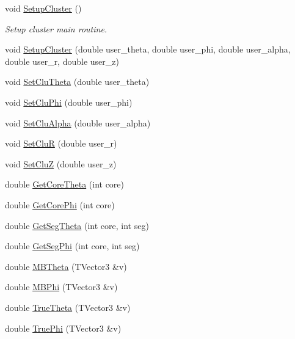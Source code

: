 \begin{DoxyCompactItemize}
\mbox{\label{class_m_b_geometry_a4d98a38f0dc1ca6a4a73477dde5cdd8d}} 
void \hyperlink{class_m_b_geometry_a4d98a38f0dc1ca6a4a73477dde5cdd8d}{Setup\+Cluster} ()
\begin{DoxyCompactList}\small\item\em Setup cluster main routine. \end{DoxyCompactList}\item 
void \hyperlink{class_m_b_geometry_ac3751c8eb94c051b402c30cb14cba462}{Setup\+Cluster} (double user\+\_\+theta, double user\+\_\+phi, double user\+\_\+alpha, double user\+\_\+r, double user\+\_\+z)
\item 
void \hyperlink{class_m_b_geometry_a9a2a8c9609141be92d7ba30e6087aa30}{Set\+Clu\+Theta} (double user\+\_\+theta)
\item 
void \hyperlink{class_m_b_geometry_a74142f84cf6317d52ae39c0e0ff8a87e}{Set\+Clu\+Phi} (double user\+\_\+phi)
\item 
void \hyperlink{class_m_b_geometry_a0d4868b0360a6e5534918a9813540015}{Set\+Clu\+Alpha} (double user\+\_\+alpha)
\item 
void \hyperlink{class_m_b_geometry_a292c4326421c78871667e91c3694ae35}{Set\+CluR} (double user\+\_\+r)
\item 
void \hyperlink{class_m_b_geometry_aa6b9d54c7157e8c65e2b208fcef8222c}{Set\+CluZ} (double user\+\_\+z)
\item 
double \hyperlink{class_m_b_geometry_a42aa536f15017724812712b0f8a77c12}{Get\+Core\+Theta} (int core)
\item 
double \hyperlink{class_m_b_geometry_a39f685610ae0e68e547a46f8ef992599}{Get\+Core\+Phi} (int core)
\item 
double \hyperlink{class_m_b_geometry_a49cdf742a2902fc85f0b24dfffa554a8}{Get\+Seg\+Theta} (int core, int seg)
\item 
double \hyperlink{class_m_b_geometry_a575ddd6022d2d686a83ebce3195b6c50}{Get\+Seg\+Phi} (int core, int seg)
\item 
double \hyperlink{class_m_b_geometry_af4adfb858000405b21f79a6bf10c3c37}{M\+B\+Theta} (T\+Vector3 \&v)
\item 
double \hyperlink{class_m_b_geometry_a399568d67bb83801ef6a2dbe963a535e}{M\+B\+Phi} (T\+Vector3 \&v)
\item 
double \hyperlink{class_m_b_geometry_afd393f9db7182de7fb19f0c934edb383}{True\+Theta} (T\+Vector3 \&v)
\item 
double \hyperlink{class_m_b_geometry_a718d9c7fcc4a5fb8b9ecaabdc7a0503f}{True\+Phi} (T\+Vector3 \&v)
\end{DoxyCompactItemize}
